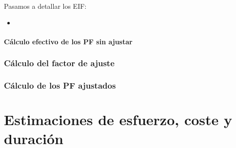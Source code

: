 \documentclass[spanish,a4paper,12pt]{report}	%
\begin{document}
	Pasamos a detallar los EIF:
	\begin{itemize}
		\item{} 

	\end{itemize}



	\subsection{Cálculo efectivo de los PF sin ajustar}


\section{Cálculo del factor de ajuste}


\section{Cálculo de los PF ajustados}


\newpage
\mbox{}
\thispagestyle{empty}						%
\newpage
\setcounter{section}{0}

\part{Estimaciones de esfuerzo, coste y duración} %


\newpage
\mbox{}
\thispagestyle{empty}						%
\newpage
\end{document}
